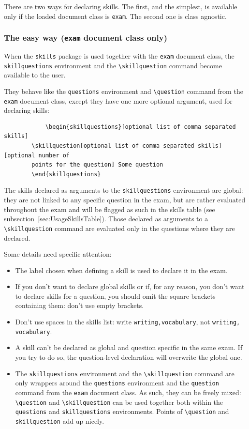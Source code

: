\documentclass[12pt]{exam}
\begin{document}
There are two ways for declaring skills. The first, and the simplest, is available
only if the loaded document class is \verb|exam|. The second one is class agnostic.

\subsubsection{The easy way (\texttt{exam} document class only)}
\label{sec:UsageDeclaringSkillsExamClass}

When the \verb|skills| package is used together with the \verb|exam| document class,
the \verb|skillquestions| environment and the \verb|\skillquestion| command become
available to the user.

They behave like the \verb|questions| environment and \verb|\question| command from
the \verb|exam| document class, except they have one more optional argument, used for
declaring skills:

\begin{center}
	\begin{verbatim}
			\begin{skillquestions}[optional list of comma separated skills]
		\skillquestion[optional list of comma separated skills][optional number of
		points for the question] Some question
		\end{skillquestions}
	\end{verbatim}
\end{center}

The skills declared as arguments to the \verb|skillquestions| environment are global:
they are not linked to any specific question in the exam, but are rather evaluated throughout
the exam and will be flagged as such in the skills table (see subsection~\ref{sec:UsageSkillsTable}). Those declared as arguments
to a \verb|\skillquestion| command are evaluated only in the questions where they are declared.

Some details need specific attention:
\begin{itemize}
	\item The label chosen when defining a skill is used to declare it in the exam.
	\item If you don't want to declare global skills or if, for any reason, you don't want to declare skills for a question, you should omit the square brackets containing them: don't use empty brackets.
	\item Don't use spaces in the skills list: write \verb|writing,vocabulary|, not \verb|writing, vocabulary|.
	\item A skill can't be declared as global and question specific in the same exam. If you try to
	do so, the question-level declaration will overwrite the global one.
	\item The \verb|skillquestions| environment and the \verb|\skillquestion| command are only wrappers around the \verb|questions| environment and the \verb|question| command from the \verb|exam| document class. As such, they can be freely mixed: \verb|\question| and \verb|\skillquestion| can be used together both within the \verb|questions| and \verb|skillquestions| environments. Points of \verb|\question| and \verb|skillquestion| add up nicely.
\end{itemize}
\end{document}

